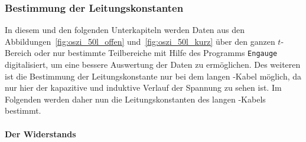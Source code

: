 \clearpage
\subsubsection{Bestimmung der Leitungskonstanten}
\label{ssub:bestimmung_der_leitungskonstanten}

In diesem und den folgenden Unterkapiteln werden Daten aus den
Abbildungen~\ref{fig:oszi_50l_offen} und~\ref{fig:oszi_50l_kurz} über den
ganzen $t$-Bereich oder nur bestimmte Teilbereiche mit Hilfe des Programms
\texttt{Engauge} digitalisiert, um eine bessere Auswertung der Daten zu
ermöglichen. Des weiteren ist die Bestimmung der Leitungskonstante nur bei
dem langen \CU-Kabel möglich, da nur hier der kapazitive und induktive Verlauf
der Spannung zu sehen ist. Im Folgenden werden daher nun die Leitungskonstanten
des langen \CU-Kabels bestimmt.

\paragraph{Der Widerstands}
\label{par:der_widerstands}

